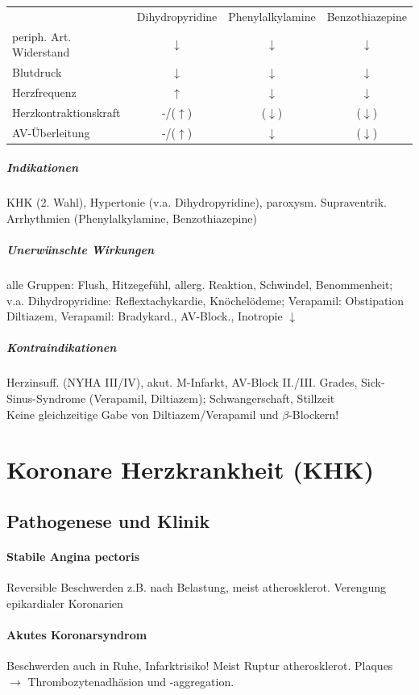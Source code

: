 \documentclass[10pt,a4paper]{report}
\begin{document}
\begin{tabularx}{\textwidth}{Xccc}
&Dihydropyridine&Phenylalkylamine&Benzothiazepine\\
periph. Art. Widerstand	&$\downarrow$&$\downarrow$&$\downarrow$\\
Blutdruck&$\downarrow$&$\downarrow$&$\downarrow$\\
Herzfrequenz&$\uparrow$&$\downarrow$&$\downarrow$\\
Herzkontraktionskraft&-/($\uparrow$)&($\downarrow$)&($\downarrow$)\\
AV-Überleitung&-/($\uparrow$)&$\downarrow$&($\downarrow$)\\
\end{tabularx}

\subparagraph{Indikationen}
KHK (2. Wahl), Hypertonie (v.a. Dihydropyridine), paroxysm. Supraventrik. Arrhythmien (Phenylalkylamine, Benzothiazepine)

\subparagraph{Unerwünschte Wirkungen} alle Gruppen: Flush, Hitzegefühl, allerg. Reaktion, Schwindel, Benommenheit; v.a. Dihydropyridine: Reflextachykardie, Knöchelödeme; Verapamil: Obstipation Diltiazem, Verapamil:  Bradykard., AV-Block., Inotropie $\downarrow$

\subparagraph{Kontraindikationen} Herzinsuff. (NYHA III/IV), akut. M-Infarkt, AV-Block II./III. Grades, Sick-Sinus-Syndrome (Verapamil, Diltiazem); Schwangerschaft, Stillzeit\\
Keine gleichzeitige Gabe von Diltiazem/Verapamil und $\beta$-Blockern!

\section{Koronare Herzkrankheit (KHK)}
\subsection{Pathogenese und Klinik}

\paragraph{Stabile Angina pectoris} Reversible Beschwerden z.B. nach Belastung, meist atherosklerot. Verengung epikardialer Koronarien
\paragraph{Akutes Koronarsyndrom}Beschwerden auch in Ruhe, Infarktrisiko! Meist Ruptur atherosklerot. Plaques $\rightarrow$ Thrombozytenadhäsion und -aggregation.
\end{document}
